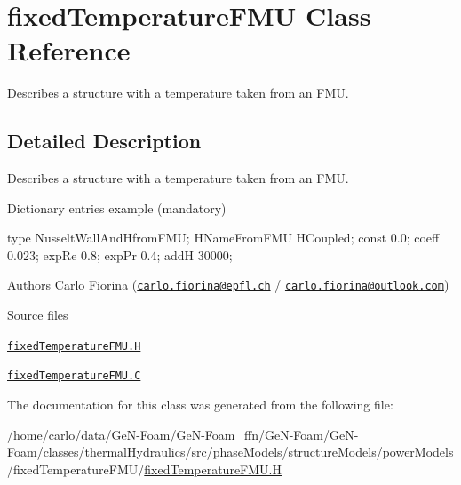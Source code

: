 \hypertarget{classFoam_1_1structures_1_1fixedTemperatureFMU}{}\section{fixed\+Temperature\+F\+MU Class Reference}
\label{classFoam_1_1structures_1_1fixedTemperatureFMU}


Describes a structure with a temperature taken from an F\+MU.  




\subsection{Detailed Description}
Describes a structure with a temperature taken from an F\+MU. 

\label{_Description}%
 Dictionary entries example (mandatory) \begin{DoxyVerb}    type            NusseltWallAndHfromFMU;
    HNameFromFMU    HCoupled;
    const   0.0;
    coeff   0.023;
    expRe   0.8;
    expPr   0.4;
    addH    30000;
\end{DoxyVerb}


Authors Carlo Fiorina (\href{mailto:carlo.fiorina@epfl.ch}{\tt carlo.\+fiorina@epfl.\+ch} / \href{mailto:carlo.fiorina@outlook.com}{\tt carlo.\+fiorina@outlook.\+com})

\begin{DoxyParagraph}{Source files}

\begin{DoxyItemize}
\item \href{../../../home/carlo/data/GeN-Foam/GeN-Foam_ffn/GeN-Foam/GeN-Foam/classes/thermalHydraulics/src/phaseModels/structureModels/powerModels/fixedTemperatureFMU/fixedTemperatureFMU.H}{\tt fixed\+Temperature\+F\+M\+U.\+H} 
\item \href{../../../home/carlo/data/GeN-Foam/GeN-Foam_ffn/GeN-Foam/GeN-Foam/classes/thermalHydraulics/src/phaseModels/structureModels/powerModels/fixedTemperatureFMU/fixedTemperatureFMU.C}{\tt fixed\+Temperature\+F\+M\+U.\+C} 
\end{DoxyItemize}
\end{DoxyParagraph}


The documentation for this class was generated from the following file\+:\begin{DoxyCompactItemize}
\item 
/home/carlo/data/\+Ge\+N-\/\+Foam/\+Ge\+N-\/\+Foam\+\_\+ffn/\+Ge\+N-\/\+Foam/\+Ge\+N-\/\+Foam/classes/thermal\+Hydraulics/src/phase\+Models/structure\+Models/power\+Models/fixed\+Temperature\+F\+M\+U/\hyperlink{fixedTemperatureFMU_8H}{fixed\+Temperature\+F\+M\+U.\+H}\end{DoxyCompactItemize}
